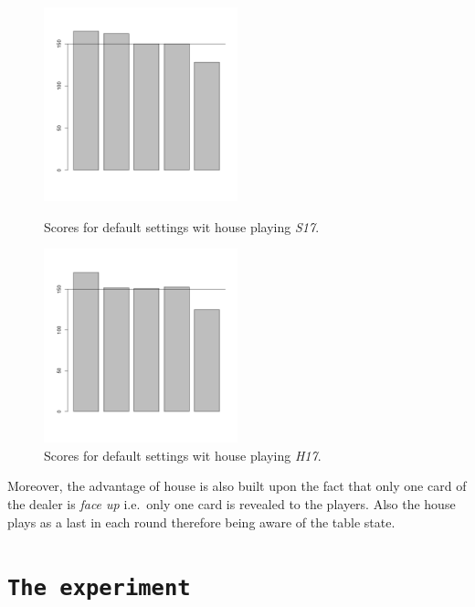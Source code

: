 \documentclass[12pt,a4paper,twocolumn]{article}
\begin{document}
\begin{figure}[htbp]
\centering
\includegraphics[width=0.5\textwidth]{s17}
\caption{Scores for default settings wit house playing \emph{S17}.\label{fig:s17}}
\includegraphics[width=0.5\textwidth]{h17}
\caption{Scores for default settings wit house playing \emph{H17}.\label{fig:h17}}
\end{figure}

Moreover, the advantage of house is also built upon the fact that only one card of the dealer is \emph{face up} i.e.\ only one card is revealed to the players. Also the house plays as a last in each round therefore being aware of the table state.\\


\section*{\texttt{The experiment}}
\end{document}
